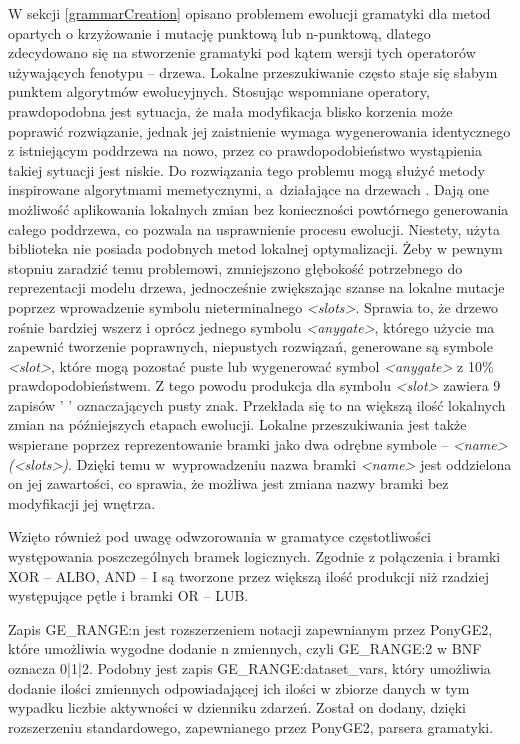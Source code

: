 W sekcji \ref{grammarCreation} opisano problemem ewolucji gramatyki dla metod opartych o krzyżowanie i mutację punktową lub n-punktową, dlatego zdecydowano się na stworzenie gramatyki pod kątem wersji tych operatorów używających fenotypu -- drzewa. Lokalne przeszukiwanie często staje się słabym punktem algorytmów ewolucyjnych. Stosując wspomniane operatory, prawdopodobna jest sytuacja, że mała modyfikacja blisko korzenia może poprawić rozwiązanie, jednak jej zaistnienie wymaga wygenerowania identycznego z istniejącym poddrzewa na nowo, przez co prawdopodobieństwo wystąpienia takiej sytuacji jest niskie. Do rozwiązania tego problemu mogą służyć metody inspirowane algorytmami memetycznymi, a~działające na drzewach \cite{memetic}. Dają one możliwość aplikowania lokalnych zmian bez konieczności powtórnego generowania całego poddrzewa, co pozwala na usprawnienie procesu ewolucji. Niestety, użyta biblioteka nie posiada podobnych metod lokalnej optymalizacji. Żeby w pewnym stopniu zaradzić temu problemowi, zmniejszono głębokość potrzebnego do reprezentacji modelu drzewa, jednocześnie zwiększając szanse na lokalne mutacje poprzez wprowadzenie symbolu nieterminalnego \textit{<slots>}. Sprawia to, że drzewo rośnie bardziej wszerz i oprócz jednego symbolu \textit{<anygate>}, którego użycie ma zapewnić tworzenie poprawnych, niepustych rozwiązań, generowane są symbole \textit{<slot>}, które mogą pozostać puste lub wygenerować symbol \textit{<anygate>} z 10\% prawdopodobieństwem. Z tego powodu produkcja dla symbolu \textit{<slot>} zawiera 9 zapisów ' ' oznaczających pusty znak. Przekłada się to na większą ilość lokalnych zmian na późniejszych etapach ewolucji. Lokalne przeszukiwania jest także wspierane poprzez reprezentowanie bramki jako dwa odrębne symbole -- \textit{<name>(<slots>)}. Dzięki temu w~wyprowadzeniu nazwa bramki \textit{<name>} jest oddzielona on jej zawartości, co sprawia, że możliwa jest zmiana nazwy bramki bez modyfikacji jej wnętrza.

Wzięto również pod uwagę odwzorowania w gramatyce częstotliwości występowania poszczególnych bramek logicznych. Zgodnie z \cite{10.1007/978-3-540-69534-9_35} połączenia i bramki XOR -- ALBO, AND -- I są tworzone przez większą ilość produkcji niż rzadziej występujące pętle i bramki OR -- LUB. 

Zapis GE{\_}RANGE:n jest rozszerzeniem notacji zapewnianym przez PonyGE2, które umożliwia wygodne dodanie n zmiennych, czyli GE{\_}RANGE:2 w BNF oznacza 0|1|2.
Podobny jest zapis GE{\_}RANGE:dataset{\_}vars, który umożliwia dodanie ilości zmiennych odpowiadającej ich ilości w zbiorze danych w tym wypadku liczbie aktywności w dzienniku zdarzeń. Został on dodany, dzięki rozszerzeniu standardowego, zapewnianego przez PonyGE2, parsera gramatyki.

